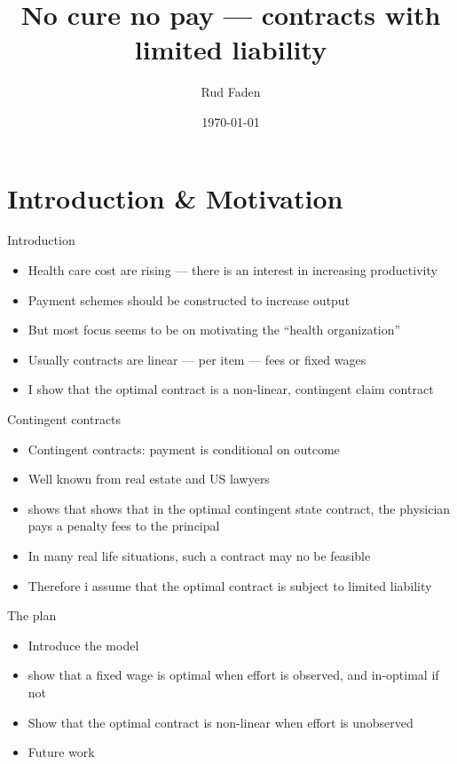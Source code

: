 \documentclass[compress]{beamer}
\title{No cure no pay --- contracts with limited liability}
\subtitle{}
\date{\today}
\author{Rud Faden}
\institute{University of Copenhagen}
\begin{document}
\maketitle

\section*{Introduction \& Motivation}
\begin{frame}{Introduction}
  \begin{itemize}[<+- | alert@+>]
    \item Health care cost are rising --- there is an interest in increasing productivity
    \item Payment schemes should be constructed to increase output
    \item But most focus seems to be on motivating the ``health organization''
    \item Usually contracts are linear --- per item --- fees or fixed wages
    \item I show that the optimal contract is a non-linear, contingent claim contract
  \end{itemize}
\end{frame}

\begin{frame}[c]{Contingent contracts}
  \begin{itemize}[<+- | alert@+>]
    \item Contingent contracts: payment is conditional on outcome
    \item Well known from real estate and US lawyers
    \item \textcite{Schoonbeek2005No} shows that shows that in the optimal contingent state contract, the physician pays a penalty fees to the principal
    \item In many real life situations, such a contract may no be feasible
    \item Therefore i assume that the optimal contract is subject to limited liability
  \end{itemize}
\end{frame}


\begin{frame}[c]{The plan}
  \begin{itemize}[<+- | alert@+>]
    \item Introduce the model
    \item show that a fixed wage is optimal when effort is observed, and in-optimal if not
    \item Show that the optimal contract is non-linear when effort is unobserved
    \item Future work
  \end{itemize}  
\end{frame}
\end{document}
